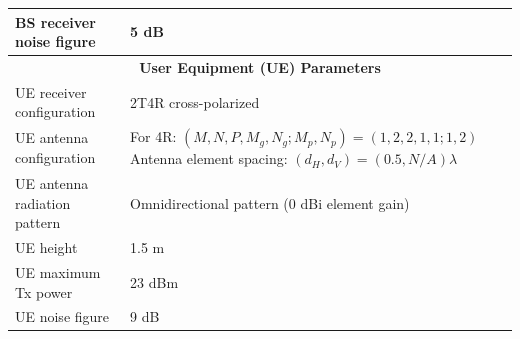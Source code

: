 \begin{table}[htbp]
\begin{tabularx}{\textwidth}{|p{}|X|}
BS receiver noise figure & 5 dB \\ \hline
\multicolumn{2}{|c|}{\textbf{User Equipment (UE) Parameters}} \\ \hline
UE receiver configuration & 2T4R cross-polarized \\ \hline
UE antenna configuration & 
  For 4R: $(M, N, P, M_g, N_g; M_p, N_p) = (1, 2, 2, 1, 1; 1, 2)$ \newline
  Antenna element spacing: $(d_H, d_V) = (0.5, N/A)\lambda$ \\ \hline
UE antenna radiation pattern & Omnidirectional pattern (0 dBi element gain) \\ \hline
UE height & 1.5 m \\ \hline
UE maximum Tx power & 23 dBm \\ \hline
UE noise figure & 9 dB \\ \hline
\end{tabularx}
\end{table}

\clearpage %

